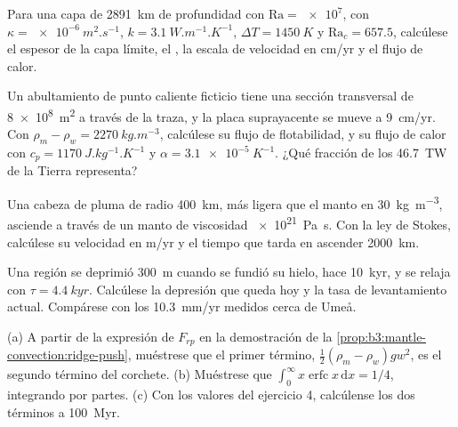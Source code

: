 \begin{exercise}[$\star\star$]\label{exo:b3:mantle-convection:6}
Para una capa de \qty{2891}{km} de profundidad con $\mathrm{Ra} = \num{e7}$, con $\kappa =
\qty{e-6}{m^2.s^{-1}}$, $k = \qty{3.1}{W.m^{-1}.K^{-1}}$, $\Delta T =
\qty{1450}{K}$ y $\mathrm{Ra}_c = 657.5$, calcúlese el espesor de la
capa límite, el , la escala de velocidad en \unit{cm/yr} y el
flujo de calor.
\end{exercise}

\begin{exercise}[$\star\star$]\label{exo:b3:mantle-convection:7}
Un abultamiento de punto caliente ficticio tiene una sección transversal de \qty{8e8}{m^2} a
través de la traza, y la placa suprayacente se mueve a \qty{9}{cm/yr}. Con $\rho_m - \rho_w =
\qty{2270}{kg.m^{-3}}$, calcúlese su flujo de flotabilidad, y su flujo de calor con $c_p =
\qty{1170}{J.kg^{-1}.K^{-1}}$ y $\alpha = \qty{3.1e-5}{K^{-1}}$. ¿Qué fracción
de los \qty{46.7}{TW} de la Tierra representa?
\end{exercise}

\begin{exercise}[$\star\star$]\label{exo:b3:mantle-convection:8}
Una cabeza de pluma de radio \qty{400}{km}, más ligera que el manto en
\qty{30}{kg.m^{-3}}, asciende a través de un manto de viscosidad \qty{e21}{Pa.s}. Con
la ley de Stokes, calcúlese su velocidad en \unit{m/yr} y el tiempo que tarda en
ascender \qty{2000}{km}.
\end{exercise}

\begin{exercise}[$\star\star$]\label{exo:b3:mantle-convection:9}
Una región se deprimió \qty{300}{m} cuando se fundió su hielo, hace \qty{10}{kyr},
y se relaja con $\tau = \qty{4.4}{kyr}$. Calcúlese la depresión que queda hoy y la
tasa de levantamiento actual. Compárese con los \qty{10.3}{mm/yr} medidos cerca de
Umeå.
\end{exercise}

\begin{exercise}[$\star\star\star$]\label{exo:b3:mantle-convection:10}
(a) A partir de la expresión de $F_{rp}$ en la demostración
de la \cref{prop:b3:mantle-convection:ridge-push}, muéstrese que el primer término,
$\tfrac12(\rho_m - \rho_w)gw^2$, es el segundo término del corchete. (b) Muéstrese que
$\int_0^\infty x\operatorname{erfc}x\,\mathrm dx = 1/4$, integrando por partes.
(c) Con los valores del ejercicio 4, calcúlense los dos términos a \qty{100}{Myr}.
\end{exercise}

